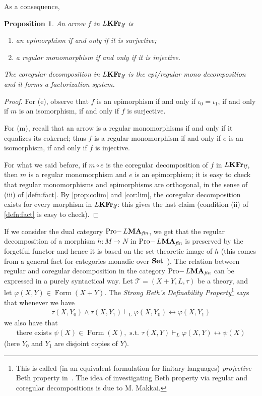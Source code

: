 \documentclass{article}
\newtheorem{prop}{Proposition}
\theoremstyle{definition}
\DeclareMathOperator{\Formulas}{Form}
\DeclareMathOperator{\Pro}{Pro-}
\newcommand{\KFr}{\textup{\textbf{KFr}}}
\newcommand{\MA}{\textup{\textbf{MA}}}
\newcommand{\fin}{\textit{fin}}
\newcommand{\lf}{\textit{lf}}
\begin{document}
As a consequence,
\begin{prop}\label{prop:injsurj}
An arrow $f$ in $L\KFr_\lf$ is
\begin{enumerate}
    \item[(e)] an epimorphism if and only if it is surjective;
    \item[(m)] a regular monomorphism if and only if it is injective.
\end{enumerate}
The coregular decomposition in $L\KFr_\lf$ is the epi/regular mono decomposition and it forms a factorization system.
\end{prop}
\begin{proof}
For (e), observe that $f$ is an epimorphism if and only if $\iota_0 = \iota_1$, if and only if $m$ is an isomorphism, if and only if $f$ is surjective.

For (m), recall that an arrow is a regular monomorphisms if and only if it equalizes its cokernel; thus $f$ is a regular monomorphism if and only if $e$ is an isomorphism, if and only if $f$ is injective.

For what we said before, if $m \circ e$ is the coregular decomposition of $f$ in $L\KFr_\lf$, then $m$ is a regular monomorphism and $e$ is an epimorphism; it is easy to check that regular monomorphisms and epimorphisms are orthogonal, in the sense of (iii) of \cref{defn:fact}. By \cref{prop:colim} and \cref{cor:lim}, the coregular decomposition exists for every morphism in $L\KFr_\lf$: this gives the last claim (condition (ii) of \cref{defn:fact} is easy to check).
\end{proof}

If we consider the dual category $\Pro L\MA_\fin$, we get that the regular decomposition of a morphism $h \colon M \longrightarrow N$ in $\Pro L\MA_\fin$ is preserved by the forgetful functor and hence it is based on the set-theoretic image of $h$ (this comes from a general fact for categories monadic over $\bf Set$~\cite{EV}). The relation between regular and coregular decomposition in the category $\Pro L\MA_\fin$ can be expressed in a purely syntactical way. Let $\mathcal{T} = (X+Y,L, \tau)$ be a theory, and let $\varphi(X,Y) \in \Formulas(X+Y)$. The \emph{Strong Beth's Definability Property}\footnote{This is called (in an equivalent formulation for finitary languages) \emph{projective} Beth property in~\cite{Mak99}.
The idea of investigating Beth property via regular and coregular decompositions is due to M. Makkai.
}  
says that whenever we have
\begin{align}\label{eq:I}
\tau(X,Y_0) \wedge \tau(X,Y_1) \vdash_L \varphi(X,Y_0) \leftrightarrow \varphi(X,Y_1)\tag{I}
\end{align}
we also have that
\begin{align}\label{eq:E}
\text{there exists } \psi(X) \in \Formulas(X), \text{ s.t.\ } \tau(X,Y)\vdash_L \varphi(X,Y) \leftrightarrow \psi(X)\tag{E}
\end{align}
(here $Y_0$ and $Y_1$ are disjoint copies of $Y$).
\end{document}
